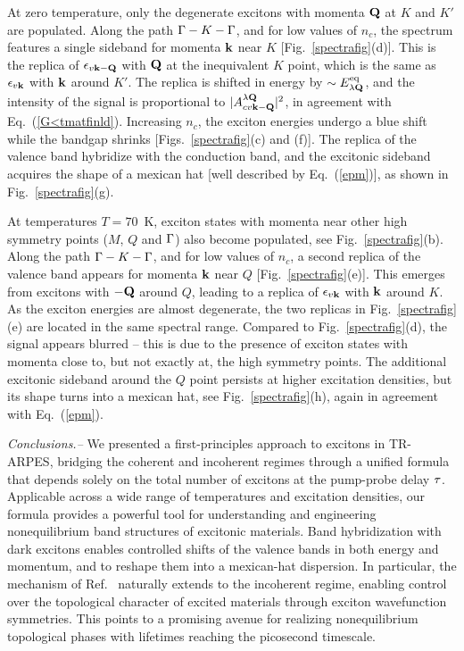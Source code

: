 \documentclass[twocolumn,aps,a4paper,superscriptaddress]{revtex4-2}
\begin{document}
At zero temperature, only the degenerate excitons with momenta ${\mathbf Q}$
at $K$ and $K'$ are populated. Along the path $\Gamma-K-\Gamma$, and
for low values of $n_{c}$, the spectrum features a single sideband
for momenta ${\mathbf k}$ near $K$ [Fig.~\ref{spectrafig}(d)].
This is the replica of $\epsilon_{v{\mathbf k}-{\mathbf Q}}$ with ${\mathbf Q}$
at the inequivalent $K$ point, which is the same as
$\epsilon_{v{\mathbf k}}$ with ${\mathbf k}$ around $K'$. The replica is shifted in
energy by $\sim E_{\lambda{\mathbf Q}}^{\rm eq}$, and the
intensity of the signal is proportional to $|A^{\lambda{\mathbf Q}}_{cv{\mathbf k}-{\mathbf Q}}|^{2}$, in
agreement with Eq.~(\ref{G<tmatfinld}). Increasing $n_{c}$,
the exciton energies undergo a blue shift while the
bandgap shrinks [Figs.~\ref{spectrafig}(c) and (f)].
The replica of the valence band hybridize with the
conduction band, and the excitonic sideband acquires the shape of a
mexican hat [well described by Eq.~(\ref{epm})], as shown in
Fig.~\ref{spectrafig}(g).

At temperatures $T=70$~K, exciton states with momenta near other high
symmetry points ($M$,
$Q$ and $\Gamma$) also become
populated, see  Fig.~\ref{spectrafig}(b).
Along the path $\Gamma-K-\Gamma$, and
for low values of $n_{c}$, a second
replica of the valence band appears for momenta ${\mathbf k}$ near
$Q$ [Fig.~\ref{spectrafig}(e)]. This emerges from
excitons with $-{\mathbf Q}$ around $Q$, leading to a replica of $\epsilon_{v{\mathbf k}}$
with ${\mathbf k}$ around $K$. As the exciton energies are almost
degenerate, the two replicas in
Fig.~\ref{spectrafig}(e) are located in the same spectral range.
Compared to Fig.~\ref{spectrafig}(d), the signal appears
blurred -- this is due to the presence of exciton states with momenta close to,
but not exactly at, the high symmetry points. The additional excitonic
sideband around the $Q$ point persists at higher excitation
densities, but its shape turns into a mexican hat, see
Fig.~\ref{spectrafig}(h), again in agreement with Eq.~(\ref{epm}).


{\em Conclusions.--} We presented a first-principles approach to
excitons in TR-ARPES, bridging the coherent and incoherent regimes
through a unified formula that depends solely on the total number of
excitons at the pump-probe delay $\tau$.
Applicable across a wide
range of temperatures and
excitation densities, our formula provides a powerful
tool for understanding and engineering nonequilibrium band structures
of excitonic materials.
Band hybridization with dark excitons enables
controlled shifts of the valence bands in both energy and momentum,
and to reshape them into a mexican-hat dispersion.
In particular,
the mechanism of
Ref.~\cite{foster_quench-induced_2014,perfetto_floquet_2020}
naturally extends to  the incoherent regime, enabling
control over the topological character of excited materials
through exciton wavefunction symmetries.
This points to a
promising avenue for realizing nonequilibrium
topological phases with
lifetimes reaching the picosecond timescale.
\end{document}
